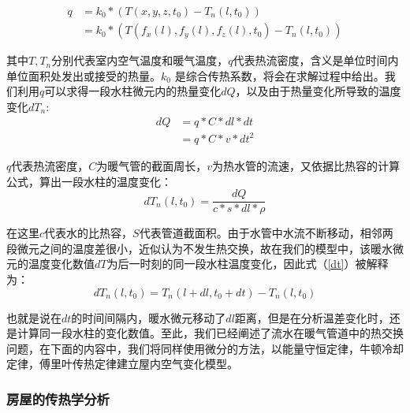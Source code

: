\documentclass{my_paper}
\begin{document}
\begin{equation}
    \begin{aligned}
        q&= k_0*(T(x,y,z,t_0)-T_n(l,t_0))\\
        &= k_0 * (T(f_x(l),f_y(l),f_z(l),t_0)-T_n(l,t_0))
    \end{aligned}
    \label{11}
\end{equation}

其中$T,T_n$分别代表室内空气温度和暖气温度，$q$代表热流密度，含义是单位时间内单位面积处发出或接受的热量。$k_0$ 是综合传热系数，将会在求解过程中给出。我们利用$ q $可以求得一段水柱微元内的热量变化$dQ$，以及由于热量变化所导致的温度变化$dT_n$:
\begin{equation}
    \begin{aligned}
        dQ &= q* C * dl * dt\\
        &= q* C * v * dt^2
    \end{aligned}
    \label{12}
\end{equation}

$q$代表热流密度，$C$为暖气管的截面周长，$v$为热水管的流速，又依据比热容的计算公式，算出一段水柱的温度变化：
\begin{equation}
    dT_n(l,t_0) = \frac{dQ}{c*s*dl*\rho}
    \label{dt}
\end{equation}

在这里$c$代表水的比热容，$S$代表管道截面积。由于水管中水流不断移动，相邻两段微元之间的温度差很小，近似认为不发生热交换，故在我们的模型中，该暖水微元的温度变化数值$dT$为后一时刻的同一段水柱温度变化，因此式（\ref{dt}）被解释为：
\begin{equation}
dT_n(l,t_0) = T_n(l+dl,t_0+dt) - T_n(l,t_0)
\label{14}
\end{equation}

也就是说在$ dt $的时间间隔内，暖水微元移动了$dl$距离，但是在分析温差变化时，还是计算同一段水柱的变化数值。至此，我们已经阐述了流水在暖气管道中的热交换问题，在下面的内容中，我们将同样使用微分的方法，以能量守恒定律，牛顿冷却定律，傅里叶传热定律建立屋内空气变化模型。

\subsubsection{房屋的传热学分析}
\end{document}
